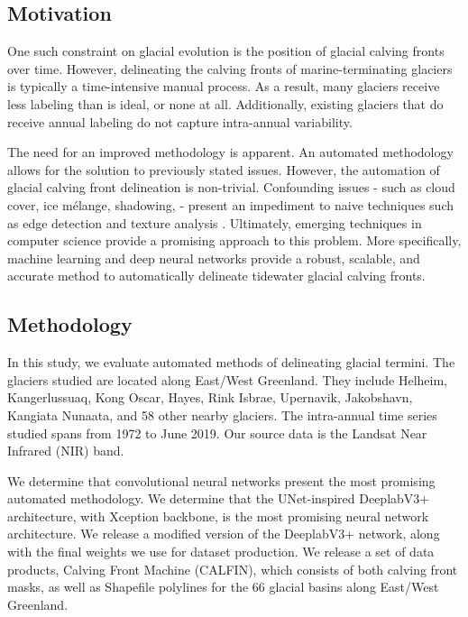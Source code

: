 \documentclass[tc, manuscript]{copernicus}
\begin{document}
\subsection{Motivation}
One such constraint on glacial evolution is the position of glacial calving fronts over time. However, delineating the calving fronts of marine-terminating glaciers is typically a time-intensive manual process. As a result, many glaciers receive less labeling than is ideal, or none at all. Additionally, existing glaciers that do receive annual labeling do not capture intra-annual variability. 

The need for an improved methodology is apparent. An automated methodology allows for the solution to previously stated issues. However, the automation of glacial calving front delineation is non-trivial. Confounding issues - such as cloud cover, ice mélange, shadowing,  - present an impediment to naive techniques such as edge detection \citep{paravolidakis2016} and texture analysis \citep{malik2001}. Ultimately, emerging techniques in computer science provide a promising approach to this problem. More specifically, machine learning and deep neural networks provide a robust, scalable, and accurate method to automatically delineate tidewater glacial calving fronts.

\subsection{Methodology}
In this study, we evaluate automated methods of delineating glacial termini. The glaciers studied are located along East/West Greenland. They include Helheim, Kangerlussuaq, Kong Oscar, Hayes, Rink Isbrae, Upernavik, Jakobshavn, Kangiata Nunaata, and 58 other nearby glaciers. The intra-annual time series studied spans from 1972 to June 2019. Our source data is the Landsat Near Infrared (NIR) band.

We determine that convolutional neural networks present the most promising automated methodology. We determine that the UNet-inspired DeeplabV3+ architecture, with Xception backbone, is the most promising neural network architecture. We release a modified version of the DeeplabV3+ network, along with the final weights we use for dataset production. We release a set of data products, Calving Front Machine (CALFIN), which consists of both calving front masks, as well as Shapefile polylines for the 66 glacial basins along East/West Greenland.
\end{document}
